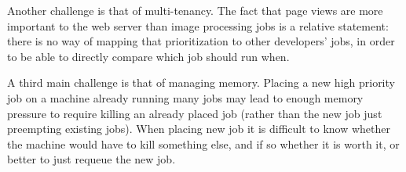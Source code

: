 Another challenge is that of multi-tenancy. The fact that page views are more
important to the web server than image processing jobs is a relative statement:
there is no way of mapping that prioritization to other developers' jobs, in
order to be able to directly compare which job should run when. 

A third main challenge is that of managing memory. Placing a new high priority
job on a machine already running many jobs may lead to enough memory pressure to
require killing an already placed job (rather than the new job just preempting
existing jobs). When placing new job it is difficult to know whether the machine
would have to kill something else, and if so whether it is worth it, or better
to just requeue the new job.

 
